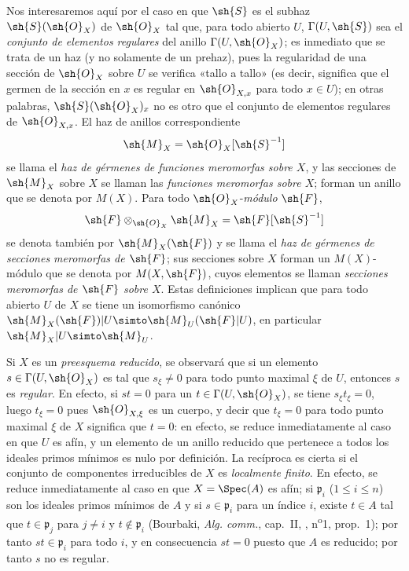 \begin{env}[20.1.3]
\label{IV.20.1.3}
Nos interesaremos aquí por el caso en que $\sh{S}$ es el subhaz $\sh{S}(\sh{O}_X)$ de $\sh{O}_X$ tal que, para todo abierto $U$, $\Gamma(U,\sh{S})$ sea el \emph{conjunto de elementos regulares} del anillo $\Gamma(U,\sh{O}_X)$; es inmediato que se trata de un haz (y no solamente de un prehaz), pues la regularidad de una sección de $\sh{O}_X$ sobre $U$ se verifica «tallo a tallo» (es decir, significa que el germen de la sección en $x$ es regular en $\sh{O}_{X,x}$ para todo $x\in U$); en otras palabras, $\sh{S}(\sh{O}_X)_x$ no es otro que el conjunto de elementos regulares de $\sh{O}_{X,x}$.
El haz de anillos correspondiente
\[
  \sh{M}_X=\sh{O}_X[\sh{S}^{-1}]
\]
se llama el \emph{haz de gérmenes de funciones meromorfas sobre $X$}, y las secciones de $\sh{M}_X$ sobre $X$ se llaman las \emph{funciones meromorfas sobre $X$}; forman un anillo que se denota por $M(X)$.
Para todo $\sh{O}_X$-\emph{módulo} $\sh{F}$,
\[
  \sh{F}\otimes_{\sh{O}_X}\sh{M}_X=\sh{F}[\sh{S}^{-1}]
\]
se denota también por $\sh{M}_X(\sh{F})$ y se llama el \emph{haz de gérmenes de secciones meromorfas de $\sh{F}$}; sus secciones sobre $X$ forman un $M(X)$-módulo que se denota por $M(X,\sh{F})$, cuyos elementos se llaman \emph{secciones meromorfas de $\sh{F}$ sobre $X$}.
Estas definiciones implican que para todo abierto $U$ de $X$ se tiene un isomorfismo canónico $\sh{M}_X(\sh{F})|U\simto\sh{M}_U(\sh{F}|U)$, en particular $\sh{M}_X|U\simto\sh{M}_U$.
\end{env}

\begin{env}[20.1.3.1]
\label{IV.20.1.3.1}
Si $X$ es un \emph{preesquema reducido}, se observará que si un elemento $s\in\Gamma(U,\sh{O}_X)$ es tal que $s_\xi\neq0$ para todo punto maximal $\xi$ de $U$, entonces $s$ es \emph{regular}.
En efecto, si $st=0$ para un $t\in\Gamma(U,\sh{O}_X)$, se tiene $s_\xi t_\xi=0$, luego $t_\xi=0$ pues $\sh{O}_{X,\xi}$ es un cuerpo, y decir que $t_\xi=0$ para todo punto maximal $\xi$ de $X$ significa que $t=0$: en efecto, se reduce inmediatamente al caso en que $U$ es afín, y un elemento de un anillo reducido que pertenece a todos los ideales primos mínimos es nulo por definición.
La recíproca es cierta si el conjunto de componentes irreducibles de $X$ es \emph{localmente finito}.
En efecto, se reduce inmediatamente al caso en que $X=\Spec(A)$ es afín; si $\mathfrak p_i$ ($1\leq i\leq n$) son los ideales primos mínimos de $A$ y si $s\in\mathfrak p_i$ para un índice $i$, existe $t\in A$ tal que $t\in\mathfrak p_j$ para $j\neq i$ y $t\notin\mathfrak p_i$ (Bourbaki, \emph{Alg. comm.}, cap.~II, , n\textsuperscript{o}1, prop.~1); por tanto $st\in\mathfrak p_i$ para todo $i$, y en consecuencia $st=0$ puesto que $A$ es reducido; por tanto $s$ no es regular.
\end{env}

